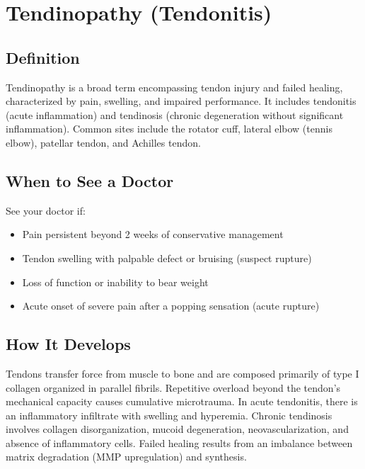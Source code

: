 \chapter{Tendinopathy (Tendonitis)}

\section*{Definition}
Tendinopathy is a broad term encompassing tendon injury and failed healing, characterized by pain, swelling, and impaired performance. It includes tendonitis (acute inflammation) and tendinosis (chronic degeneration without significant inflammation). Common sites include the rotator cuff, lateral elbow (tennis elbow), patellar tendon, and Achilles tendon.

\section*{When to See a Doctor}
See your doctor if:
\begin{itemize}
  \item Pain persistent beyond 2 weeks of conservative management
  \item Tendon swelling with palpable defect or bruising (suspect rupture)
  \item Loss of function or inability to bear weight
  \item Acute onset of severe pain after a popping sensation (acute rupture)
\end{itemize}

\section*{How It Develops}
Tendons transfer force from muscle to bone and are composed primarily of type I collagen organized in parallel fibrils. Repetitive overload beyond the tendon's mechanical capacity causes cumulative microtrauma. In acute tendonitis, there is an inflammatory infiltrate with swelling and hyperemia. Chronic tendinosis involves collagen disorganization, mucoid degeneration, neovascularization, and absence of inflammatory cells. Failed healing results from an imbalance between matrix degradation (MMP upregulation) and synthesis.

